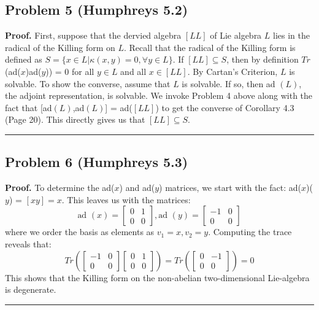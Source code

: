 \documentclass[12pt]{article}%
\newenvironment{proof}[1][Proof]{\textbf{#1.} }{\ \rule{0.5em}{0.5em}}
\begin{document}
\subsection*{Problem 5 (Humphreys 5.2)}
\begin{proof}
  First, suppose that the dervied algebra $[LL]$ of Lie algebra $L$ lies in the radical of the Killing form on $L$. Recall that the radical of the Killing form is defined as $S = \{x \in L \vert \kappa(x,y) = 0, \forall y \in L\}$. If $[LL] \subseteq S$, then by definition $Tr$(ad($x$)ad($y$)) = 0 for all $y \in L$ and all $x \in [LL]$. By Cartan's Criterion, $L$ is solvable. \newline
  To show the converse, assume that $L$ is solvable. If so, then ad $(L)$, the adjoint representation, is solvable. We invoke Problem 4 above along with the fact that [ad$(L)$,ad$(L)$] = ad($[LL]$) to get the converse of Corollary 4.3 (Page 20). This directly gives us that $[LL] \subseteq S$.
\end{proof}

\subsection*{Problem 6 (Humphreys 5.3)}
\begin{proof}
  To determine the ad($x$) and ad($y$) matrices, we start with the fact: ad($x$)($y$) = $[xy] = x$. This leaves us with the matrices:
  $$ \text{ad }(x) = \left[ \begin{array}{ccc} 0 & 1 \\ 0 & 0 \end{array} \right], \text{ad }(y) = \left[ \begin{array}{ccc} -1 & 0 \\ 0 & 0 \end{array} \right] $$ where we order the basis as elements as $v_1 = x, v_2 = y$. Computing the trace reveals that:
  $$ Tr( \left[ \begin{array}{ccc} -1 & 0 \\ 0 & 0 \end{array} \right]\left[ \begin{array}{ccc} 0 & 1 \\ 0 & 0 \end{array} \right]) = Tr(\left[ \begin{array}{ccc} 0 & -1 \\ 0 & 0 \end{array} \right]) = 0$$ This shows that the Killing form on the non-abelian two-dimensional Lie-algebra is degenerate.
\end{proof}
\end{document}
